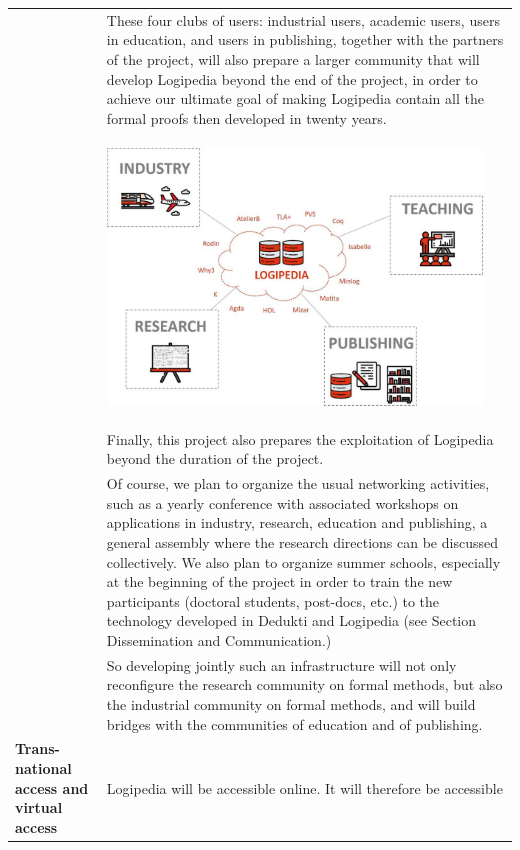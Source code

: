 \begin{longtable}{|p{}|p{}|}
&
\hspace{0.4cm}
These four clubs of users: industrial users, academic users, users in 
education, and users in publishing, together with the partners of the 
project, will also
prepare a larger community that will develop Logipedia beyond the end
of the project, in order to achieve our ultimate goal of making
Logipedia contain all the formal proofs then developed in twenty
years.\\
&
\begin{center}
\includegraphics[width=10cm]{img/Schema-reduced}
\end{center}\\
&
\hspace{0.4cm}
Finally, this project also prepares the exploitation of Logipedia
beyond the duration of the project.\\
&
\hspace{0.4cm}
Of course, we plan to organize the usual networking activities,
such as a yearly conference with associated workshops on applications
in industry, research, education and publishing, a general assembly
where the research directions can be discussed collectively. We also plan to organize
summer schools, especially at the beginning of the project in order to
train the new participants (doctoral students, post-docs, etc.) to the
technology developed in Dedukti and Logipedia
(see Section Dissemination and Communication.)\\
&
\hspace{0.4cm}
So developing jointly such an infrastructure will not only reconfigure
the research community on formal methods, but also the industrial
community on formal methods, and will build bridges with the communities
of education and of publishing.\\
\hline
{\bf Trans-national access and virtual access}
&
Logipedia will be accessible online. It will therefore be accessible

\end{longtable}
